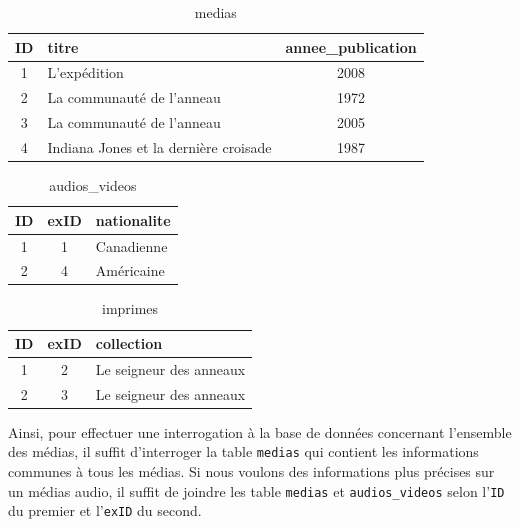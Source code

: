 \documentclass[letter, 11pt]{report}
\begin{document}
\begin{table}[htbp]
	\caption{medias}
	\label{tab:sf-medias}
	\begin{center}
		\begin{tabular}{|c|l|c|}
			\hline
			ID & titre                                 & annee\_publication \\
			\hline
			1  & L'expédition                          & 2008 \\
			2  & La communauté de l'anneau             & 1972 \\
			3  & La communauté de l'anneau             & 2005 \\
			4  & Indiana Jones et la dernière croisade & 1987 \\
			\hline
		\end{tabular}
	\end{center}
\end{table}

\begin{table}[h!tbp]
	\caption{audios\_videos}
	\label{tab:sf-audios-videos}
	\begin{center}
		\begin{tabular}{|c|c|l|}
			\hline
			ID & exID & nationalite \\
			\hline
			1  & 1    & Canadienne \\
			2  & 4    & Américaine \\
			\hline
		\end{tabular}
	\end{center}
\end{table}

\begin{table}[htbp]
	\caption{imprimes}
	\label{tab:sf-imprimes}
	\begin{center}
		\begin{tabular}{|c|c|l|}
			\hline
			ID & exID & collection \\
			\hline
			1  & 2    & Le seigneur des anneaux \\
			2  & 3    & Le seigneur des anneaux \\
			\hline
		\end{tabular}
	\end{center}
\end{table}

Ainsi, pour effectuer une interrogation à la base de données concernant l'ensemble des médias, il suffit d'interroger la table \texttt{medias} qui contient les informations communes à tous les médias. Si nous voulons des informations plus précises sur un médias audio, il suffit de joindre les table \texttt{medias} et \texttt{audios\_videos} selon l'\texttt{ID} du premier et l'\texttt{exID} du second.
\end{document}
